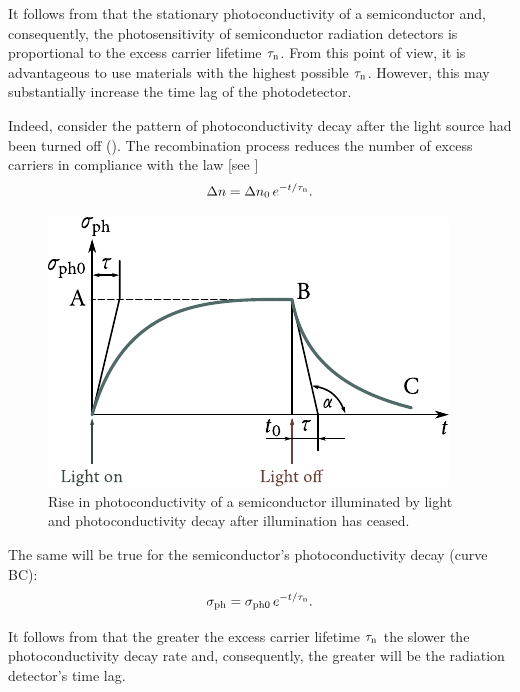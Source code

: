 It follows from  that the stationary photoconductivity of a semiconductor and, consequently, the photosensitivity of semiconductor radiation detectors is proportional to the excess carrier lifetime $\tau_{\text{n}}$. From this point of view, it is advantageous to use materials with the highest possible $\tau_{\text{n}}$. However, this may substantially increase the time lag of the photodetector.

Indeed, consider the pattern of photoconductivity decay after the light source had been turned off (). The recombination process reduces the number of excess carriers in compliance with the law [see ]
\begin{equation*}
	\Delta{n} = \Delta{n}_0\, e^{-t/\tau_{\text{n}}}.
\end{equation*}

\begin{figure}[t]
	\begin{center}
		\includegraphics[scale=1]{figures/ch_06/fig_6_19.pdf}
		\caption[]{Rise in photoconductivity of a semiconductor illuminated by light and photoconductivity decay after illumination has ceased.}
		\label{fig:6_19}
	\end{center}
	\vspace{-0.7cm}
\end{figure}

The same will be true for the semiconductor's photoconductivity decay (curve BC):
\begin{equation}\label{eq:6_50}
	\sigma_{\text{ph}} = \sigma_{\text{ph$0$}}\, e^{-t/\tau_{\text{n}}}.
\end{equation}

It follows from  that the greater the excess carrier lifetime $\tau_{\text{n}}$ the slower the photoconductivity decay rate and, consequently, the greater will be the radiation detector's time lag.

